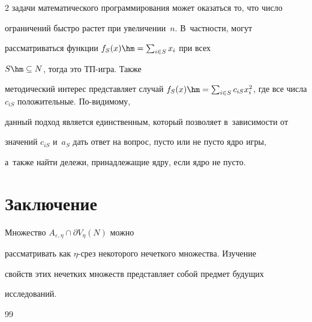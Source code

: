 \begin{multicols}{2}
задачи математического программирования может оказаться то, что число 

ограничений быстро рас\-тет при увеличении~$n$. В~частности, могут 

рассматриваться функции $f_S(x)\hm= \sum\nolimits_{i\in S} x_i$ при всех 

$S\hm\subseteq N$, тогда это ТП-иг\-ра. Также 

методический интерес представляет случай $f_S(x)\hm= \sum\nolimits_{i\in S} 

c_{iS} x_i^2$, где все числа $c_{iS}$ положительные. По-ви\-ди\-мо\-му, 

данный подход является единственным, который позволяет в~зависимости от 

значений $c_{iS}$ и~$a_S$ дать ответ на вопрос, пусто или не пусто ядро игры, 

а~также найти дележи, принадлежащие ядру, если ядро не пусто.



\vspace*{-10pt}



\section{Заключение}



\vspace*{-2pt}



    Множество $A_{\varepsilon,\eta}\cap \partial V_\eta(N)$ можно 

рассматривать как $\eta$-срез некоторого нечеткого множества. Изучение 

свойств этих нечетких множеств представляет собой предмет будущих 

исследований.



\vspace*{-10pt}



{\small\frenchspacing

 {\baselineskip=10.5pt


 \begin{thebibliography}{99}

 

 \vspace*{-2pt}


\end{thebibliography}}}
\end{multicols}
